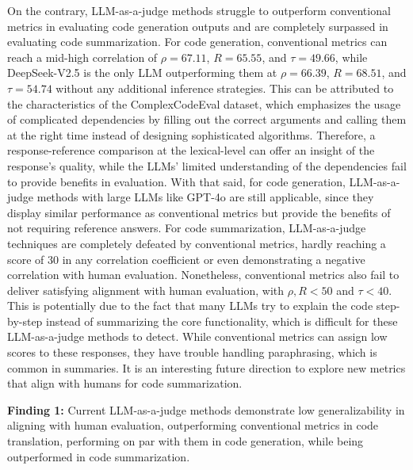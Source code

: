 On the contrary, LLM-as-a-judge methods struggle to outperform conventional metrics in evaluating code generation outputs and are completely surpassed in evaluating code summarization. For code generation, conventional metrics can reach a mid-high correlation of \(\rho=67.11\), \(R=65.55\), and \(\tau=49.66\), while DeepSeek-V2.5 is the only LLM outperforming them at \(\rho=66.39\), \(R=68.51\), and \(\tau=54.74\) without any additional inference strategies. This can be attributed to the characteristics of the ComplexCodeEval dataset, which emphasizes the usage of complicated dependencies by filling out the correct arguments and calling them at the right time instead of designing sophisticated algorithms. Therefore, a response-reference comparison at the lexical-level can offer an insight of the response's quality, while the LLMs' limited understanding of the dependencies fail to provide benefits in evaluation. With that said, for code generation, LLM-as-a-judge methods with large LLMs like GPT-4o are still applicable, since they display similar performance as conventional metrics but provide the benefits of not requiring reference answers. For code summarization, LLM-as-a-judge techniques are completely defeated by conventional metrics, hardly reaching a score of 30 in any correlation coefficient or even demonstrating a negative correlation with human evaluation. Nonetheless, conventional metrics also fail to deliver satisfying alignment with human evaluation, with \(\rho,R<50\) and \(\tau<40\). This is potentially due to the fact that many LLMs try to explain the code step-by-step instead of summarizing the core functionality, which is difficult for these LLM-as-a-judge methods to detect. While conventional metrics can assign low scores to these responses, they have trouble handling paraphrasing, which is common in summaries. It is an interesting future direction to explore new metrics that align with humans for code summarization.

\vspace*{6pt}
\begin{leftbar}
\textbf{Finding 1:} Current LLM-as-a-judge methods demonstrate low generalizability in aligning with human evaluation, outperforming conventional metrics in code translation, performing on par with them in code generation, while being outperformed in code summarization.
\end{leftbar}
\vspace*{6pt}

